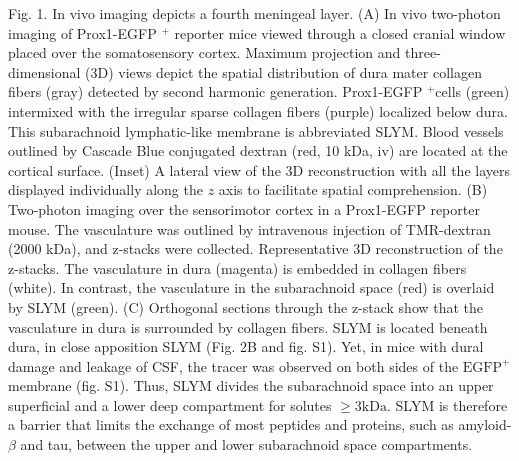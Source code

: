 Fig. 1. In vivo imaging depicts a fourth meningeal layer. (A) In vivo two-photon imaging of Prox1-EGFP ${ }^{+}$ reporter mice viewed through a closed cranial window placed over the somatosensory cortex. Maximum projection and three-dimensional (3D) views depict the spatial distribution of dura mater collagen fibers (gray) detected by second harmonic generation. Prox1-EGFP ${ }^{+}$cells (green) intermixed with the irregular sparse collagen fibers (purple) localized below dura. This subarachnoid lymphatic-like membrane is abbreviated SLYM. Blood vessels outlined by Cascade Blue conjugated dextran (red, 10 kDa, iv) are located at the cortical surface. (Inset) A lateral view of the 3D reconstruction with all the layers displayed individually along the $z$ axis to facilitate spatial comprehension. (B) Two-photon imaging over the sensorimotor cortex in a Prox1-EGFP reporter mouse. The vasculature was outlined by intravenous injection of TMR-dextran (2000 kDa), and z-stacks were collected. Representative 3D reconstruction of the z-stacks. The vasculature in dura (magenta) is embedded in collagen fibers (white). In contrast, the vasculature in the subarachnoid space (red) is overlaid by SLYM (green). (C) Orthogonal sections through the z-stack show that the vasculature in dura is surrounded by collagen fibers. SLYM is located beneath dura, in close apposition SLYM (Fig. 2B and fig. S1). Yet, in mice with dural damage and leakage of CSF, the tracer was observed on both sides of the $\mathrm{EGFP}^{+}$membrane (fig. S1). Thus, SLYM divides the subarachnoid space into an upper superficial and a lower deep compartment for solutes $\geq 3 \mathrm{kDa}$. SLYM is therefore a barrier that limits the exchange of most peptides and proteins, such as amyloid- $\beta$ and tau, between the upper and lower subarachnoid space compartments.

